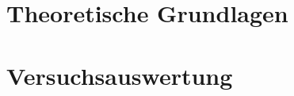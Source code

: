 \documentclass{include/thesisclass2}
\begin{document}
    \tableofcontents                  
    \newpage


\chapter{Theoretische Grundlagen}
\chapter{Versuchsauswertung}
\end{document}

